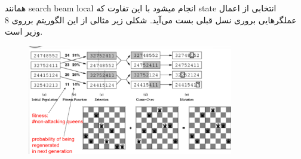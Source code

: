 همانند search beam local انجام میشود با این تفاوت که state انتخابی از اعمال عملگرهایی بروری نسل قبلی بست می‌آید.
شکلی زیر مثالی از این الگوریتم برروی 8 وزیر است.

\begin{figure}[H]
    \centering
    \includegraphics[width=0.8\textwidth]{source/genric-algo.png}
    \label{fig:genetic-algo}
\end{figure}